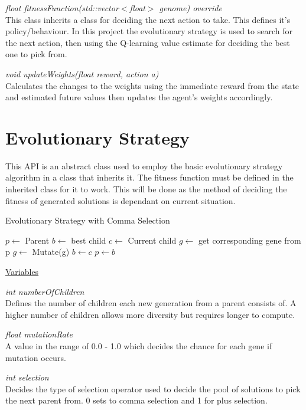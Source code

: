 \documentclass{report}
\begin{document}
\textit{float fitnessFunction(std::vector$<$float$>$ genome) override}\\
This class inherits a class for deciding the next action to take. This defines it's policy/behaviour. In this project the evolutionary strategy 
is used to search for the next action, then using the Q-learning value estimate for deciding the best one to pick from.

\textit{void updateWeights(float reward, action a)}\\
Calculates the changes to the weights using the immediate reward from the state and estimated future values then updates the agent's weights accordingly.

\section{Evolutionary Strategy}
This API is an abstract class used to employ the basic evolutionary strategy algorithm in a class that inherits it. The fitness function must be defined
in the inherited class for it to work. This will be done as the method of deciding the fitness of generated solutions is dependant on current situation.

\begin{algorithm}
\caption{Evolutionary Strategy with Comma Selection}
\label{alg:escs}
\begin{algorithmic}[1]
\State $p \leftarrow$ Parent
\State $b \leftarrow$ best child
\State $c \leftarrow$ Current child
\State $g \leftarrow$ get corresponding gene from p
\State $g \leftarrow$ Mutate(g)
\EndFor
{}
\State $b \leftarrow c$
\EndIf
\EndFor
\State $p \leftarrow b$
\end{algorithmic}
\end{algorithm}

\noindent\underline{Variables}

\textit{int numberOfChildren}\\
Defines the number of children each new generation from a parent consists of. A higher number of children allows more diversity but requires longer to compute.

\textit{float mutationRate}\\
A value in the range of 0.0 - 1.0 which decides the chance for each gene if mutation occurs.

\textit{int selection}\\
Decides the type of selection operator used to decide the pool of solutions to pick the next parent from. 0 sets to comma selection and 1 for plus selection.
\end{document}
